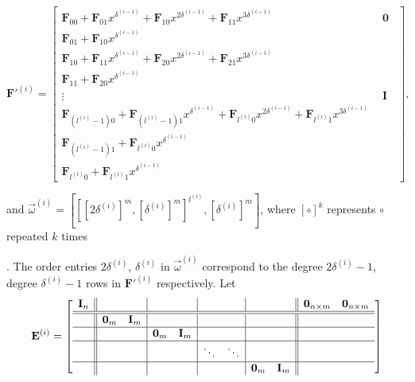 \begin{equation}
\mathbf{F}'^{\left(i\right)}=\left[\begin{array}{l|c}
\mathbf{F}_{00}+\mathbf{F}_{01}x^{\delta^{\left(i-1\right)}}+\mathbf{F}_{10}x^{2\delta^{\left(i-1\right)}}+\mathbf{F}_{11}x^{3\delta^{\left(i-1\right)}} & ~~\mathbf{0}~~\\
\hline \mathbf{F}_{01}+\mathbf{F}_{10}x^{\delta^{\left(i-1\right)}}\\
\mathbf{F}_{10}+\mathbf{F}_{11}x^{\delta^{\left(i-1\right)}}+\mathbf{F}_{20}x^{2\delta^{\left(i-1\right)}}+\mathbf{F}_{21}x^{3\delta^{\left(i-1\right)}}\\
\mathbf{F}_{11}+\mathbf{F}_{20}x^{\delta^{\left(i-1\right)}}\\
\vdots & ~~\mathbf{I}~~\\
\mathbf{F}_{\left(l^{\left(i\right)}-1\right)0}+\mathbf{F}_{\left(l^{\left(i\right)}-1\right)1}x^{\delta^{\left(i-1\right)}}+\mathbf{F}_{l^{\left(i\right)}0}x^{2\delta^{\left(i-1\right)}}+\mathbf{F}_{l^{\left(i\right)}1}x^{3\delta^{\left(i-1\right)}}\\
\mathbf{F}_{\left(l^{\left(i\right)}-1\right)1}+\mathbf{F}_{l^{\left(i\right)}0}x^{\delta^{\left(i-1\right)}}\\
\mathbf{F}_{l^{\left(i\right)}0}+\mathbf{F}_{l^{\left(i\right)}1}x^{\delta^{\left(i-1\right)}}
\end{array}\right],\label{eq:extendedStorjohannTransform}
\end{equation}
\begin{comment}
This is not ideal, but no better idea. 
\end{comment}
{} and $\vec{\omega}^{\left(i\right)}=\left[\left[[2\delta^{\left(i\right)}]^{m},[\delta^{\left(i\right)}]^{m}\right]^{l^{\left(i\right)}},[\delta^{\left(i\right)}]^{m}\right]$,
where $\left[\circ\right]^{k}$ represents $\circ$ repeated $k$
times%
\begin{comment}
Not sure if using this notation is a good thing to do, but it saves
space and makes presentation easier 
\end{comment}
. The order entries $2\delta^{\left(i\right)}$, $\delta^{\left(i\right)}$
in $\vec{\omega}^{\left(i\right)}$ correspond to the degree $2\delta^{\left(i\right)}-1$,
degree $\delta^{\left(i\right)}-1$ rows in $\mathbf{F}'^{\left(i\right)}$
respectively. Let 
\[
\mathbf{E}^{\left(i\right)}=\left[\begin{array}{c||cc|cc|cc|cc||cc}
\mathbf{I}_{n} &  &  &  &  &  &  &  &  & \mathbf{0}_{n\times m} & \mathbf{0}_{n\times m}\\
\hline\hline  & \mathbf{0}_{m} & \mathbf{I}_{m} &  &  &  &  &  &  & \ \\
\hline  &  &  & \mathbf{0}_{m} & \mathbf{I}_{m} &  &  &  &  & \ \\
\hline  &  &  &  &  & \ddots & \ddots &  &  & \ \\
\hline  &  &  &  &  &  &  & \mathbf{0}_{m} & \mathbf{I}_{m}
\end{array}\right]
\]
